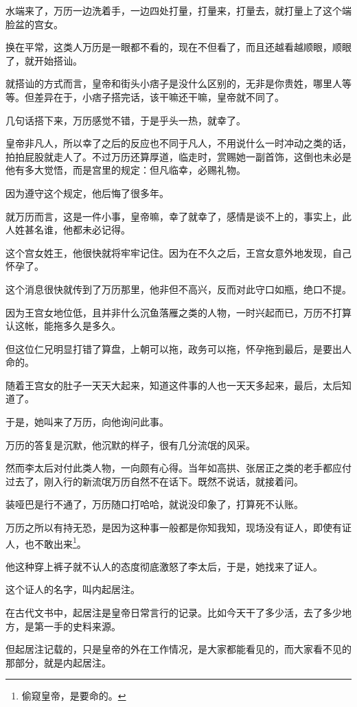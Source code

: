 \begin{multicols}{\theparacolNo}
水端来了，万历一边洗着手，一边四处打量，打量来，打量去，就打量上了这个端脸盆的宫女。

换在平常，这类人万历是一眼都不看的，现在不但看了，而且还越看越顺眼，顺眼了，就开始搭讪。

就搭讪的方式而言，皇帝和街头小痞子是没什么区别的，无非是你贵姓，哪里人等等。但差异在于，小痞子搭完话，该干嘛还干嘛，皇帝就不同了。

几句话搭下来，万历感觉不错，于是乎头一热，就幸了。

皇帝非凡人，所以幸了之后的反应也不同于凡人，不用说什么一时冲动之类的话，拍拍屁股就走人了。不过万历还算厚道，临走时，赏赐她一副首饰，这倒也未必是他有多大觉悟，而是宫里的规定：但凡临幸，必赐礼物。

因为遵守这个规定，他后悔了很多年。

就万历而言，这是一件小事，皇帝嘛，幸了就幸了，感情是谈不上的，事实上，此人姓甚名谁，他都未必记得。

这个宫女姓王，他很快就将牢牢记住。因为在不久之后，王宫女意外地发现，自己怀孕了。

这个消息很快就传到了万历那里，他非但不高兴，反而对此守口如瓶，绝口不提。

因为王宫女地位低，且并非什么沉鱼落雁之类的人物，一时兴起而已，万历不打算认这帐，能拖多久是多久。

但这位仁兄明显打错了算盘，上朝可以拖，政务可以拖，怀孕拖到最后，是要出人命的。

随着王宫女的肚子一天天大起来，知道这件事的人也一天天多起来，最后，太后知道了。

于是，她叫来了万历，向他询问此事。

万历的答复是沉默，他沉默的样子，很有几分流氓的风采。

然而李太后对付此类人物，一向颇有心得。当年如高拱、张居正之类的老手都应付过去了，刚入行的新流氓万历自然不在话下。既然不说话，就接着问。

装哑巴是行不通了，万历随口打哈哈，就说没印象了，打算死不认账。

万历之所以有持无恐，是因为这种事一般都是你知我知，现场没有证人，即使有证人，也不敢出来\footnote{偷窥皇帝，是要命的。}。

他这种穿上裤子就不认人的态度彻底激怒了李太后，于是，她找来了证人。

这个证人的名字，叫内起居注。

在古代文书中，起居注是皇帝日常言行的记录。比如今天干了多少活，去了多少地方，是第一手的史料来源。

但起居注记载的，只是皇帝的外在工作情况，是大家都能看见的，而大家看不见的那部分，就是内起居注。


\end{multicols}
